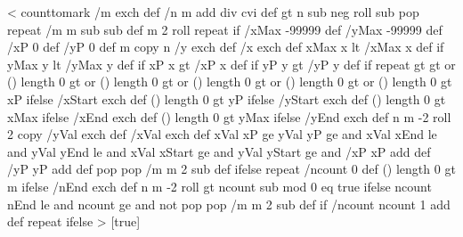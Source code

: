 %
\def\listplot@ii#1{%
  \@nameuse{beginplot@\psplotstyle}%
  \addto@pscode{/D {} def mark}%
  #1%
  \addto@pscode{%
    \tx@PreparePoints
    \pst@number\psxunit
    \pst@number\psyunit
    \tx@ScalePoints%
  }%
  \@nameuse{endplot@\psplotstyle}%
}
%
<{%
  counttomark /m exch def
  /n m \psk@plotNoMax{} add div cvi def
  \psk@plotNoMax{} gt {%
    n {
      \psk@plotNoMax\space \psk@plotNo{} sub neg roll %
      \psk@plotNoMax{} sub { pop } repeat %
      /m m \psk@plotNoMax{} sub sub def
      m 2 roll
    } repeat
  } if %
  /xMax -99999 def /yMax -99999 def
  /xP 0 def /yP 0 def
  m copy
  n {
    /y exch def /x exch def
    xMax x lt { /xMax x def } if
    yMax y lt {/yMax y def } if
    xP x gt { /xP x def } if
    yP y gt { /yP y def } if
  } repeat
  \psk@xStep{} gt \psk@yStep{} gt or (\psk@xStart) length 0 gt or
  (\psk@yStart) length 0 gt or (\psk@xEnd) length 0 gt or (\psk@yEnd) length 0 gt or {
%
    (\psk@xStart) length 0 gt {\psk@xStart\space }{ xP } ifelse /xStart exch def
    (\psk@yStart) length 0 gt {\psk@yStart\space }{ yP } ifelse /yStart exch def
    (\psk@xEnd) length 0 gt { \psk@xEnd\space }{ xMax } ifelse /xEnd exch def
    (\psk@yEnd) length 0 gt { \psk@yEnd\space }{ yMax } ifelse /yEnd exch def
    n {
      m -2 roll
      2 copy /yVal exch def /xVal exch def
      xVal xP ge
      yVal yP ge and
      xVal xEnd le and
      yVal yEnd le and
      xVal xStart ge and
      yVal yStart ge and {
        /xP xP \psk@xStep\space add def
        /yP yP \psk@yStep\space add def
      }{%
        pop pop
        /m m 2 sub def
      } ifelse
    } repeat
  }{%
    /ncount 0 def
    (\psk@nEnd) length 0 gt { \psk@nEnd\space }{ m } ifelse 
    /nEnd exch def
    n {
      m -2 roll
      \psk@nStep{} gt {
        ncount \psk@nStart\space sub \psk@nStep\space mod 0 eq }{ true } ifelse
        ncount nEnd le and
        ncount \psk@nStart\space ge and not {
          pop pop
          /m m 2 sub def
        } if
        /ncount ncount 1 add def
      } repeat
  } ifelse
}>
%
%
%
\newdimen\psk@llx
\newdimen\psk@lly
\newdimen\psk@urx
\newdimen\psk@ury
{}
\newif\ifPst@plot@box
{}[true]{}

